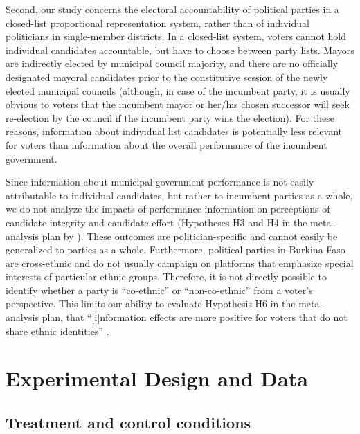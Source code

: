 \documentclass[11pt]{article}
\begin{document}
Second, our study concerns the electoral accountability of political parties in a closed-list proportional representation system, rather than of individual politicians in single-member districts. In a closed-list system, voters cannot hold individual candidates accountable, but have to choose between party lists. Mayors are indirectly elected by municipal council majority, and there are no officially designated mayoral candidates prior to the constitutive session of the newly elected municipal councils (although, in case of the incumbent party, it is usually obvious to voters that the incumbent mayor or her/his chosen successor will seek re-election by the council if the incumbent party wins the election). For these reasons, information about individual list candidates is potentially less relevant for voters than information about the overall performance of the incumbent government. 
  
Since information about municipal government performance is not easily attributable to individual candidates, but rather to incumbent parties as a whole, we do not analyze the impacts of performance information on perceptions of candidate integrity and candidate effort (Hypotheses H3 and H4 in the meta-analysis plan by \citet{MetaPAP}). These outcomes are politician-specific and cannot easily be generalized to parties as a whole. Furthermore, political parties in Burkina Faso are cross-ethnic and do not usually campaign on platforms that emphasize special interests of particular ethnic groups. Therefore, it is not directly possible to identify whether a party is ``co-ethnic'' or ``non-co-ethnic'' from a voter's perspective. This limits our ability to evaluate Hypothesis H6 in the meta-analysis plan, that ``[i]nformation effects are more positive for voters that do not share ethnic identities'' \citep[5]{MetaPAP}. 

\section{Experimental Design and Data}

\subsection{Treatment and control conditions}
\end{document}
